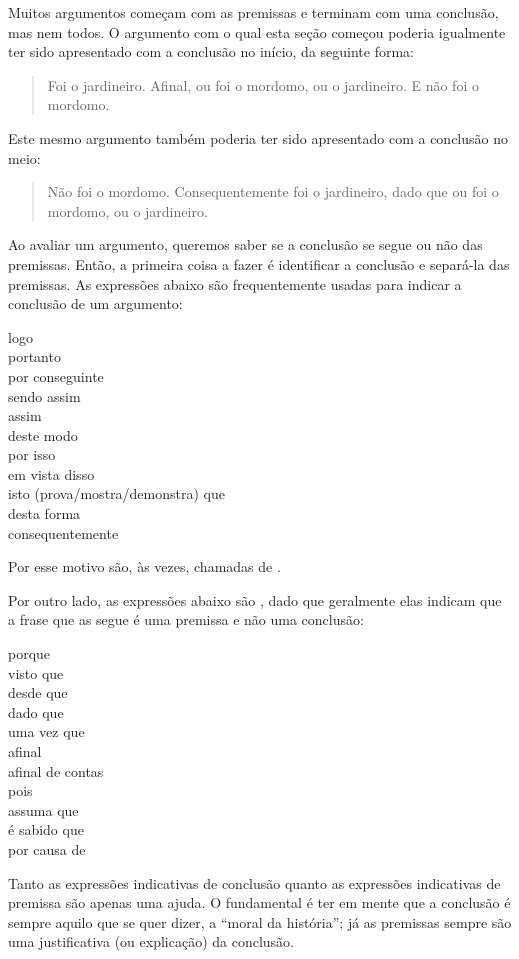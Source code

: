 Muitos argumentos começam com as premissas e terminam com uma conclusão, mas nem todos. O argumento com o qual esta seção começou poderia igualmente ter sido apresentado com a conclusão no início, da seguinte forma:
	\begin{quote}
		Foi o jardineiro. Afinal, ou foi o mordomo, ou o jardineiro. E não foi o mordomo.
	\end{quote}
Este mesmo argumento também poderia ter sido apresentado com a conclusão no meio:
	\begin{quote}
		Não foi o mordomo. Consequentemente foi o jardineiro, dado que ou foi o mordomo, ou o jardineiro.
	\end{quote}
Ao avaliar um argumento, queremos saber se a conclusão se segue ou não das premissas.
Então, a primeira coisa a fazer é identificar a conclusão e separá-la das premissas.
As expressões abaixo são frequentemente usadas para indicar a conclusão de um argumento:
	\begin{center}
		logo\\ portanto\\ por conseguinte\\ sendo assim\\ assim\\ deste modo\\ por isso\\ em vista disso\\ isto (prova/mostra/demonstra) que\\ desta forma\\ consequentemente
	\end{center}
Por esse motivo são, às vezes, chamadas de .

Por outro lado, as expressões abaixo são , dado que geralmente elas indicam que a frase que as segue é uma premissa e não uma conclusão:
	\begin{center}
		porque\\ visto que\\ desde que\\ dado que\\ uma vez que\\ afinal\\ afinal de contas\\ pois\\ assuma que\\ é sabido que\\ por causa de
	\end{center}
Tanto as expressões indicativas de conclusão quanto as expressões indicativas de premissa são apenas uma ajuda.
O fundamental é ter em mente que a conclusão é sempre aquilo que se quer dizer, a ``moral da história''; já as premissas sempre são uma justificativa (ou explicação) da conclusão. 


